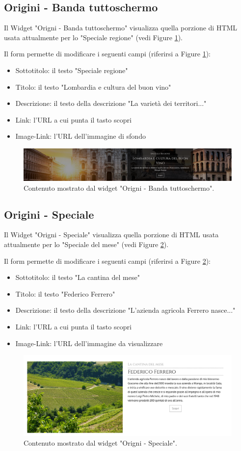 \newpage
\subsection{Origini - Banda tuttoschermo}
Il Widget "Origni - Banda tuttoschermo" visualizza quella porzione di HTML
usata attualmente per lo "Speciale regione" (vedi Figure \ref{fig:oreg}).

Il form permette di modificare i seguenti campi (riferirsi a Figure \ref{fig:oreg}):
\begin{itemize}
\item Sottotitolo: il testo "Speciale regione"
\item Titolo: il testo "Lombardia e cultura del buon vino"
\item Descrizione: il testo della descrizione "La varietà dei territori..."
\item Link: l'URL a cui punta il tasto scopri
\item Image-Link: l'URL dell'immagine di sfondo
\end{itemize}

\begin{figure}
  \includegraphics[width=\textwidth]{figure/oreg.png}
  \caption{Contenuto mostrato dal widget "Origni - Banda tuttoschermo".}
  \label{fig:oreg}
\end{figure}

\newpage
\subsection{Origini - Speciale}
Il Widget "Origni - Speciale" visualizza quella porzione di HTML
usata attualmente per lo "Speciale del mese" (vedi Figure \ref{fig:ospec}).

Il form permette di modificare i seguenti campi (riferirsi a Figure \ref{fig:ospec}):
\begin{itemize}
\item Sottotitolo: il testo "La cantina del mese"
\item Titolo: il testo "Federico Ferrero"
\item Descrizione: il testo della descrizione "L’azienda agricola Ferrero nasce..."
\item Link: l'URL a cui punta il tasto scopri
\item Image-Link: l'URL dell'immagine da visualizzare
\end{itemize}

\begin{figure}
  \includegraphics[width=\textwidth]{figure/ospec.png}
  \caption{Contenuto mostrato dal widget "Origni - Speciale".}
  \label{fig:ospec}
\end{figure}

